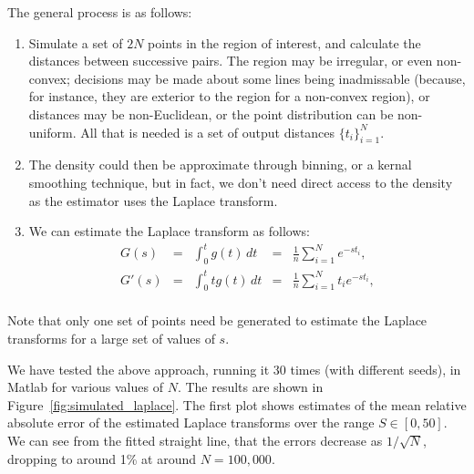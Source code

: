 \documentclass{article}
\begin{document}
The general process is as follows:
\begin{enumerate}

\item Simulate a set of $2N$ points in the region of interest, and
  calculate the distances between successive pairs. The region may be
  irregular, or even non-convex; decisions may be made about some
  lines being inadmissable (because, for instance, they are exterior
  to the region for a non-convex region), or distances may be
  non-Euclidean, or the point distribution can be non-uniform. All
  that is needed is a set of output distances $\{ t_i \}_{i=1}^{N}$.

\item The density could then be approximate through binning, or a
  kernal smoothing technique, but in fact, we don't need direct access
  to the density as the estimator uses the Laplace transform.

\item We can estimate the Laplace transform as follows:
\begin{equation}
    \label{eq:numerical_laplace}
  \begin{array}{rclcl}
    G(s) & = & \displaystyle \int_0^t g(t) \, dt     & = & \displaystyle \frac{1}{n} \sum_{i=1}^{N} e^{-s t_i}, \\
    G'(s) & = & \displaystyle  \int_0^t t g(t) \, dt & = & \displaystyle \frac{1}{n} \sum_{i=1}^{N} t_i e^{-s t_i}, \\    
  \end{array}
\end{equation}

\end{enumerate}
Note that only one set of points need be generated to estimate the
Laplace transforms for a large set of values of $s$. 

We have tested the above approach, running it 30 times (with different
seeds), in Matlab for various values of $N$. The results are shown in
Figure~\ref{fig:simulated_laplace}. The first plot shows estimates of
the mean relative absolute error of the estimated Laplace transforms
over the range $S \in [0, 50]$. We can see from the fitted straight
line, that the errors decrease as $1/\sqrt{N}$, dropping to around 1\%
at around $N=100,000$.
\end{document}
